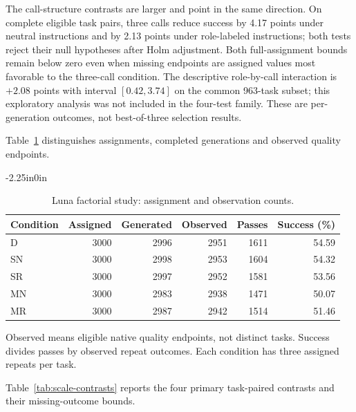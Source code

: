 \documentclass[10pt,letterpaper]{article}
\begin{document}
The call-structure contrasts are larger and point in the same direction. On complete eligible task pairs, three calls reduce success by 4.17 points under neutral instructions and by 2.13 points under role-labeled instructions; both tests reject their null hypotheses after Holm adjustment. Both full-assignment bounds remain below zero even when missing endpoints are assigned values most favorable to the three-call condition. The descriptive role-by-call interaction is $+2.08$ points with interval $[0.42,3.74]$ on the common 963-task subset; this exploratory analysis was not included in the four-test family. These are per-generation outcomes, not best-of-three selection results.

Table~\ref{tab:scale-quality} distinguishes assignments, completed generations and observed quality endpoints.

\FloatBarrier
\begin{table}[!ht]
\begin{adjustwidth}{-2.25in}{0in}\centering
\caption{Luna factorial study: assignment and observation counts.}
\label{tab:scale-quality}
\begin{tabular}{lrrrrr}\toprule
Condition & Assigned & Generated & Observed & Passes & Success (\%)\\\midrule
D & 3000 & 2996 & 2951 & 1611 & 54.59\\
SN & 3000 & 2998 & 2953 & 1604 & 54.32\\
SR & 3000 & 2997 & 2952 & 1581 & 53.56\\
MN & 3000 & 2983 & 2938 & 1471 & 50.07\\
MR & 3000 & 2987 & 2942 & 1514 & 51.46\\
\bottomrule\end{tabular}
\par\smallskip\noindent Observed means eligible native quality endpoints, not distinct tasks. Success divides passes by observed repeat outcomes. Each condition has three assigned repeats per task.
\end{adjustwidth}
\end{table}
\FloatBarrier

Table~\ref{tab:scale-contrasts} reports the four primary task-paired contrasts and their missing-outcome bounds.
\end{document}

